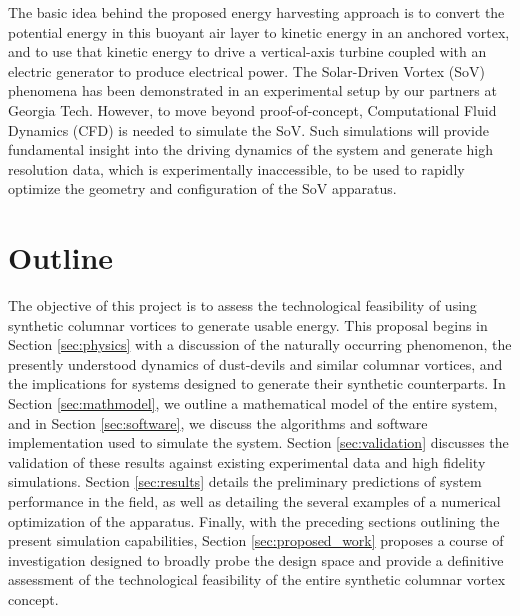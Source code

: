 The basic idea behind the proposed energy harvesting approach is to convert the 
potential energy in this buoyant air layer to kinetic energy in an
anchored vortex, and to use that kinetic energy to drive a
vertical-axis turbine coupled with an electric generator  to
produce electrical power. 
The Solar-Driven Vortex (SoV) phenomena has been demonstrated in
an experimental setup by our partners at Georgia Tech. However, to 
move beyond proof-of-concept, Computational Fluid 
Dynamics (CFD) is needed to simulate the SoV. Such simulations will
provide fundamental insight into the 
driving dynamics of the system and generate high resolution data, which is
experimentally inaccessible, to be used to rapidly optimize the
geometry and configuration of the SoV apparatus. 


%
%

\section{Outline}

The objective of this project is to assess the technological feasibility of 
using synthetic columnar vortices to generate usable energy. 
This proposal begins in Section \ref{sec:physics} with a discussion of the 
naturally occurring phenomenon, the presently understood dynamics of
dust-devils and similar columnar vortices, and the implications for systems
designed to generate their synthetic counterparts. 
In Section \ref{sec:mathmodel}, we outline a mathematical model of
the entire system, and in Section \ref{sec:software}, we discuss the
algorithms and software implementation used to simulate the
system. Section \ref{sec:validation} discusses the 
validation of these results against existing experimental data and high
fidelity simulations. Section \ref{sec:results} details the preliminary
predictions of system performance in the field, as well as detailing the 
several examples of a numerical optimization of the apparatus. Finally, with the 
preceding sections outlining the present simulation capabilities, 
Section \ref{sec:proposed_work} proposes a course of investigation
designed to broadly probe the design space and provide a
definitive assessment of the technological feasibility of the entire 
synthetic columnar vortex concept. 



